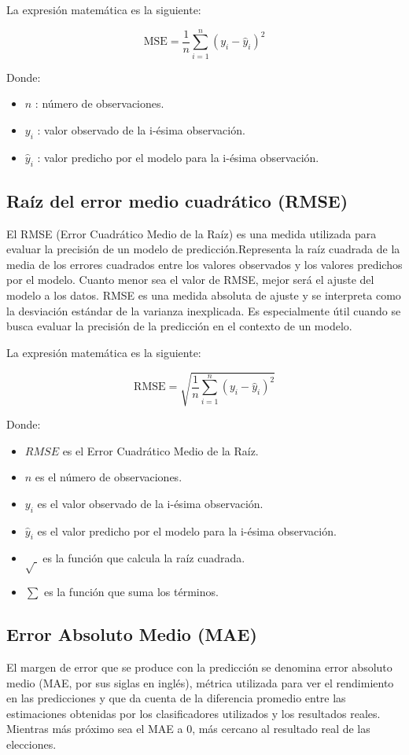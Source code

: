 La expresión matemática es la siguiente:

\[
  \text{MSE} = \frac{1}{n} \sum_{i=1}^{n} (y_i - \hat{y}_i)^2
\]

Donde:

\begin{itemize}
  \item $n$ : número de observaciones.
  \item $y_i$ : valor observado de la i-ésima observación.
  \item $\hat{y}_i$ : valor predicho por el modelo para la i-ésima observación.
\end{itemize}

\subsection{Raíz del error medio cuadrático (RMSE)}

El RMSE (Error Cuadrático Medio de la Raíz) es una medida utilizada para
evaluar la precisión de un modelo de predicción.Representa la raíz cuadrada de
la media de los errores cuadrados entre los valores observados y los valores
predichos por el modelo. Cuanto menor sea el valor de RMSE, mejor será el
ajuste del modelo a los datos\cite{sepulveda2023analisis}. RMSE es una medida
absoluta de ajuste y se interpreta como la desviación estándar de la varianza
inexplicada. Es especialmente útil cuando se busca evaluar la precisión de la
predicción en el contexto de un modelo.

La expresión matemática es la siguiente:

\[
  \text{RMSE} = \sqrt{\frac{1}{n} \sum_{i=1}^{n} (y_i - \hat{y}_i)^2}
\]

Donde:

\begin{itemize}
  \item $RMSE$ es el Error Cuadrático Medio de la Raíz.
  \item $n$ es el número de observaciones.
  \item $y_i$ es el valor observado de la i-ésima observación.
  \item $\hat{y}_i$ es el valor predicho por el modelo para la i-ésima observación.
  \item \(\sqrt{\ }\) es la función que calcula la raíz cuadrada.
  \item $\sum$ es la función que suma los términos.
\end{itemize}

\subsection{Error Absoluto Medio (MAE)}
El margen de error que se produce con la predicción se denomina error absoluto
medio (MAE, por sus siglas en inglés), métrica utilizada para ver el
rendimiento en las predicciones y que da cuenta de la diferencia promedio entre
las estimaciones obtenidas por los clasificadores utilizados y los resultados
reales. Mientras más próximo sea el MAE a 0, más cercano al resultado real de
las elecciones\cite{santander2017redes}.

